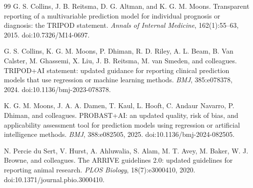 \documentclass[11pt,a4paper]{article}
\newcommand{\1}{\mathbf{1}}
\begin{document}
\begin{thebibliography}{99}
G. S. Collins, J. B. Reitsma, D. G. Altman, and K. G. M. Moons.
Transparent reporting of a multivariable prediction model for individual prognosis or diagnosis: the TRIPOD statement.
\emph{Annals of Internal Medicine}, 162(1):55--63, 2015.
doi:10.7326/M14-0697.

G. S. Collins, K. G. M. Moons, P. Dhiman, R. D. Riley, A. L. Beam, B. Van Calster,
M. Ghassemi, X. Liu, J. B. Reitsma, M. van Smeden, and colleagues.
TRIPOD+AI statement: updated guidance for reporting clinical prediction models that use regression or machine learning methods.
\emph{BMJ}, 385:e078378, 2024.
doi:10.1136/bmj-2023-078378.

K. G. M. Moons, J. A. A. Damen, T. Kaul, L. Hooft, C. Andaur Navarro, P. Dhiman,
and colleagues.
PROBAST+AI: an updated quality, risk of bias, and applicability assessment tool for prediction models using regression or artificial intelligence methods.
\emph{BMJ}, 388:e082505, 2025.
doi:10.1136/bmj-2024-082505.

N. Percie du Sert, V. Hurst, A. Ahluwalia, S. Alam, M. T. Avey, M. Baker,
W. J. Browne, and colleagues.
The ARRIVE guidelines 2.0: updated guidelines for reporting animal research.
\emph{PLOS Biology}, 18(7):e3000410, 2020.
doi:10.1371/journal.pbio.3000410.

\end{thebibliography}
\end{document}
